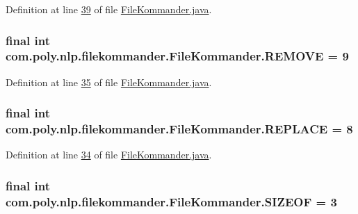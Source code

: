 Definition at line \hyperlink{L39}{39} of file \hyperlink{}{File\-Kommander.\-java}.

\hypertarget{classcom_1_1poly_1_1nlp_1_1filekommander_1_1_file_kommander_ae5cf939b72c1ec4e11127b45fdd5e637}{
\subsubsection[{R\-E\-M\-O\-V\-E}]{\setlength{\rightskip}{0pt plus 5cm}final int com.\-poly.\-nlp.\-filekommander.\-File\-Kommander.\-R\-E\-M\-O\-V\-E = 9\hspace{0.3cm}{\ttfamily [static]}}}\label{classcom_1_1poly_1_1nlp_1_1filekommander_1_1_file_kommander_ae5cf939b72c1ec4e11127b45fdd5e637}


Definition at line \hyperlink{L35}{35} of file \hyperlink{}{File\-Kommander.\-java}.

\hypertarget{classcom_1_1poly_1_1nlp_1_1filekommander_1_1_file_kommander_a43509f431e53076b0419cd5560077132}{
\subsubsection[{R\-E\-P\-L\-A\-C\-E}]{\setlength{\rightskip}{0pt plus 5cm}final int com.\-poly.\-nlp.\-filekommander.\-File\-Kommander.\-R\-E\-P\-L\-A\-C\-E = 8\hspace{0.3cm}{\ttfamily [static]}}}\label{classcom_1_1poly_1_1nlp_1_1filekommander_1_1_file_kommander_a43509f431e53076b0419cd5560077132}


Definition at line \hyperlink{L34}{34} of file \hyperlink{}{File\-Kommander.\-java}.

\hypertarget{classcom_1_1poly_1_1nlp_1_1filekommander_1_1_file_kommander_a6775052df5b5feaa10c69e1496e59f67}{
\subsubsection[{S\-I\-Z\-E\-O\-F}]{\setlength{\rightskip}{0pt plus 5cm}final int com.\-poly.\-nlp.\-filekommander.\-File\-Kommander.\-S\-I\-Z\-E\-O\-F = 3\hspace{0.3cm}{\ttfamily [static]}}}\label{classcom_1_1poly_1_1nlp_1_1filekommander_1_1_file_kommander_a6775052df5b5feaa10c69e1496e59f67}


